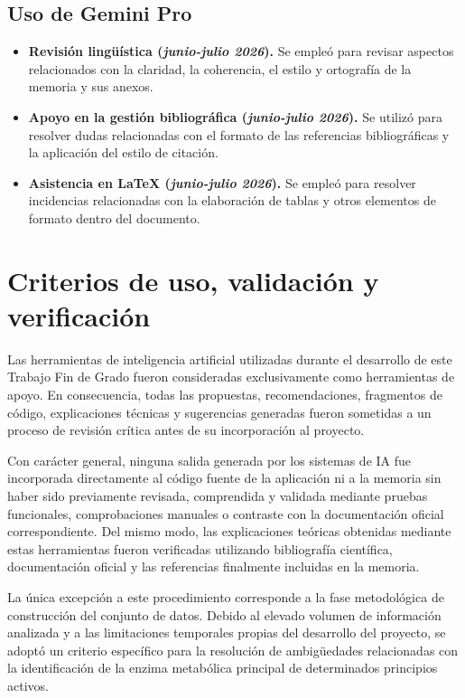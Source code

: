 \subsection{Uso de Gemini Pro}

\begin{itemize}
    \item \textbf{Revisión lingüística (\textit{junio-julio 2026}).} Se empleó para revisar aspectos relacionados con la claridad, la coherencia, el estilo y ortografía de la memoria y sus anexos.
    \item \textbf{Apoyo en la gestión bibliográfica (\textit{junio-julio 2026}).} Se utilizó para resolver dudas relacionadas con el formato de las referencias bibliográficas y la aplicación del estilo de citación.
    \item \textbf{Asistencia en LaTeX (\textit{junio-julio 2026}).} Se empleó para resolver incidencias relacionadas con la elaboración de tablas y otros elementos de formato dentro del documento.
\end{itemize}

\section{Criterios de uso, validación y verificación}

Las herramientas de inteligencia artificial utilizadas durante el desarrollo de este Trabajo Fin de Grado fueron consideradas exclusivamente como herramientas de apoyo. En consecuencia, todas las propuestas, recomendaciones, fragmentos de código, explicaciones técnicas y sugerencias generadas fueron sometidas a un proceso de revisión crítica antes de su incorporación al proyecto.

Con carácter general, ninguna salida generada por los sistemas de IA fue incorporada directamente al código fuente de la aplicación ni a la memoria sin haber sido previamente revisada, comprendida y validada mediante pruebas funcionales, comprobaciones manuales o contraste con la documentación oficial correspondiente. Del mismo modo, las explicaciones teóricas obtenidas mediante estas herramientas fueron verificadas utilizando bibliografía científica, documentación oficial y las referencias finalmente incluidas en la memoria.

La única excepción a este procedimiento corresponde a la fase metodológica de construcción del conjunto de datos. Debido al elevado volumen de información analizada y a las limitaciones temporales propias del desarrollo del proyecto, se adoptó un criterio específico para la resolución de ambigüedades relacionadas con la identificación de la enzima metabólica principal de determinados principios activos.

